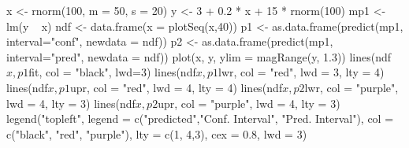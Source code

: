 \begin{Schunk}
\begin{Sinput}
 x <- rnorm(100, m = 50, s = 20)
 y <- 3 + 0.2 * x + 15 * rnorm(100)
 mp1 <- lm(y ~ x)
 ndf <- data.frame(x = plotSeq(x,40))
 p1 <- as.data.frame(predict(mp1, interval="conf", newdata = ndf))
 p2 <- as.data.frame(predict(mp1, interval="pred", newdata = ndf))
 plot(x, y, ylim = magRange(y, 1.3))
 lines(ndf$x, p1$fit, col = "black", lwd=3)
 lines(ndf$x, p1$lwr, col = "red", lwd = 3, lty = 4)
 lines(ndf$x, p1$upr, col = "red", lwd = 4, lty = 4)
 lines(ndf$x, p2$lwr, col = "purple", lwd = 4, lty = 3)
 lines(ndf$x, p2$upr, col = "purple", lwd = 4, lty = 3)
 legend("topleft", legend = c("predicted","Conf. Interval", "Pred. Interval"), col = c("black", "red", "purple"), lty = c(1, 4,3), cex = 0.8, lwd = 3)
\end{Sinput}
\end{Schunk}
